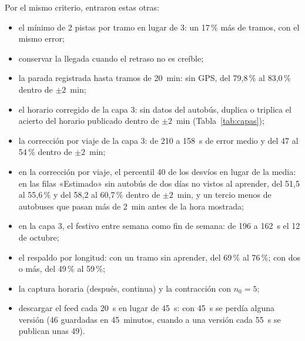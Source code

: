 Por el mismo criterio, entraron estas otras:

\begin{itemize}
  \item el mínimo de 2 pistas por tramo en lugar de 3: un 17\,\% más de tramos, con el mismo error;
  \item conservar la llegada cuando el retraso no es creíble;
  \item la parada registrada hasta tramos de 20~min: sin GPS, del 79,8\,\% al 83,0\,\% dentro de $\pm2$~min;
  \item el horario corregido de la capa 3: sin datos del autobús, duplica o triplica el acierto del horario publicado
        dentro de $\pm2$~min (Tabla~\ref{tab:capas});
  \item la corrección por viaje de la capa 3: de 210 a 158~s de error medio y del 47 al 54\,\% dentro de $\pm2$~min;
  \item en la corrección por viaje, el percentil 40 de los desvíos en lugar de la media: en las filas «Estimado» sin
        autobús de dos días no vistos al aprender, del 51,5 al 55,6\,\% y del 58,2 al 60,7\,\% dentro de
        $\pm2$~min, y un tercio menos de autobuses que pasan más de 2~min antes de la hora mostrada;
  \item en la capa 3, el festivo entre semana como fin de semana: de 196 a 162~s el 12 de octubre;
  \item el respaldo por longitud: con un tramo sin aprender, del 69\,\% al 76\,\%; con dos o más, del 49\,\% al
        59\,\%;
  \item la captura horaria (después, continua) y la contracción con $n_0=5$;
  \item descargar el feed cada 20~s en lugar de 45~s: con 45~s se perdía alguna versión (46 guardadas en 45~minutos,
        cuando a una versión cada 55~s se publican unas 49).
\end{itemize}

